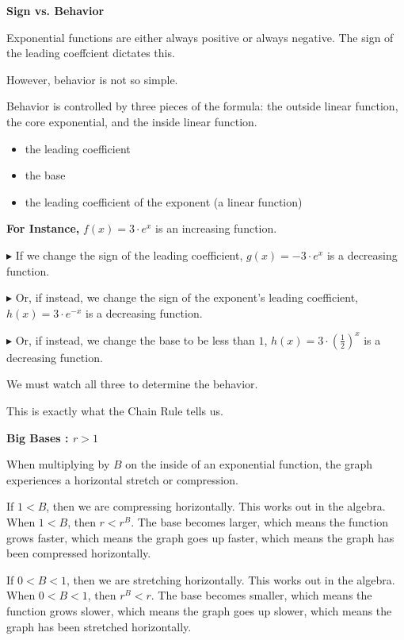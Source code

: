 \documentclass{ximera}
\begin{document}
\begin{warning}  \textbf{\textcolor{red!70!black}{Sign vs. Behavior}}


Exponential functions are either always positive or always negative. The sign of the leading coeffcient dictates this.


However, behavior is not so simple.


Behavior is controlled by three pieces of the formula: the outside linear function, the core exponential, and the inside linear function.


\begin{itemize}
   \item the leading coefficient
   \item the base
   \item the leading coefficient of the exponent (a linear function)
\end{itemize}



\textbf{For Instance,} $f(x) = 3 \cdot e^{x}$ is an increasing function.

\textbf{\textcolor{blue!55!black}{$\blacktriangleright$}} If we change the sign of the leading coefficient, $g(x) = -3 \cdot e^{x}$ is a decreasing function.


\textbf{\textcolor{blue!55!black}{$\blacktriangleright$}} Or, if instead, we change the sign of the exponent's leading coefficient, $h(x) = 3 \cdot e^{-x}$ is a decreasing function.


\textbf{\textcolor{blue!55!black}{$\blacktriangleright$}} Or, if instead, we change the base to be less than $1$, $h(x) = 3 \cdot \left( \frac{1}{2} \right)^{x}$ is a decreasing function.



We must watch all three to determine the behavior.


This is exactly what the Chain Rule tells us.

\end{warning}




\begin{observation} \textbf{\textcolor{-red!75}{Big Bases : $r > 1$}}     



When multiplying by $B$ on the inside of an exponential function, the graph experiences a horizontal stretch or compression.


If $1 < B$, then we are compressing horizontally.  This works out in the algebra. When $1 < B$, then $r < r^B$. The base becomes larger, which means the function grows faster, which means the graph goes up faster, which means the graph has been compressed horizontally. 



If $0 < B < 1$, then we are stretching horizontally.  This works out in the algebra. When $0 < B < 1$, then $r^B < r$. The base becomes smaller, which means the function grows slower, which means the graph goes up slower, which means the graph has been stretched horizontally.


\end{observation}
\end{document}
